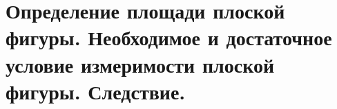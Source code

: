 {
	\section{Определение площади плоской фигуры. Необходимое и достаточное условие измеримости плоской фигуры.
	Следствие.}

	\newpage
}